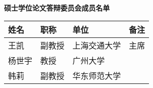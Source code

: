 \newpage
\pagestyle{empty}

\ \\

\centerline{\sihao \bf 硕士学位论文答辩委员会成员名单}

\vspace{0.7cm}

\begin{table}[h]
    \centering
    \sihao
    \renewcommand\arraystretch{2}  %
    \begin{tabular}{
      | >{\centering\arraybackslash}m{2cm}  %
      | >{\centering\arraybackslash}m{2cm}  %
      | >{\centering\arraybackslash}m{5cm}  %
      | >{\centering\arraybackslash}m{2cm}  %
      |}
      \hline
      \bf \vspace{-0.2cm} 姓名 & \bf \vspace{-0.2cm} 职称 & \bf \vspace{-0.2cm} 单位 & \bf \vspace{-0.2cm} 备注 \\  %
      \hline
      \vspace{-0.2cm} 王凯   & \vspace{-0.2cm} 副教授   & \vspace{-0.2cm} 上海交通大学 & \vspace{-0.2cm} 主席   \\  %
      \hline
      \vspace{-0.2cm} 杨世宇   & \vspace{-0.2cm} 教授   & \vspace{-0.2cm} 广州大学 &    \\  %
      \hline
      \vspace{-0.2cm} 韩莉   & \vspace{-0.2cm} 副教授   & \vspace{-0.2cm} 华东师范大学 &    \\  %
      \hline
    \end{tabular}
    \end{table}

\cleardoublepage